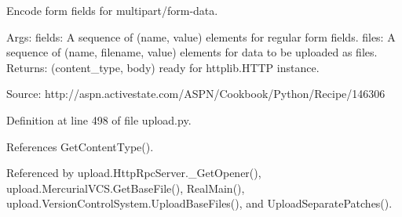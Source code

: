 \begin{DoxyVerb}Encode form fields for multipart/form-data.

Args:
  fields: A sequence of (name, value) elements for regular form fields.
  files: A sequence of (name, filename, value) elements for data to be
         uploaded as files.
Returns:
  (content_type, body) ready for httplib.HTTP instance.

Source:
  http://aspn.activestate.com/ASPN/Cookbook/Python/Recipe/146306
\end{DoxyVerb}
 

Definition at line 498 of file upload.\+py.



References Get\+Content\+Type().



Referenced by upload.\+Http\+Rpc\+Server.\+\_\+\+Get\+Opener(), upload.\+Mercurial\+V\+C\+S.\+Get\+Base\+File(), Real\+Main(), upload.\+Version\+Control\+System.\+Upload\+Base\+Files(), and Upload\+Separate\+Patches().


